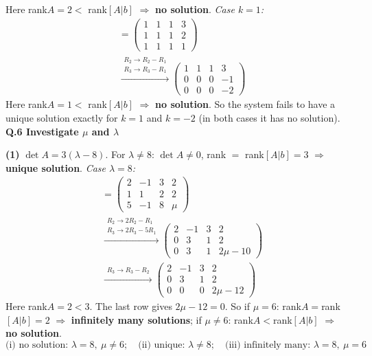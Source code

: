 Here rank$A=2<$ rank$[A|b]$ $\Rightarrow$ \textbf{no solution}.
\noindent\emph{Case $k=1$:}
\begin{align*}
[A|b] &= \left(\begin{array}{ccc|c}1 & 1 & 1 & 3 \\ 1 & 1 & 1 & 2 \\ 1 & 1 & 1 & 1\end{array}\right) \\
&\xrightarrow{\substack{R_2\to R_2-R_1\\ R_3\to R_3-R_1}} \left(\begin{array}{ccc|c}1 & 1 & 1 & 3 \\ 0 & 0 & 0 & -1 \\ 0 & 0 & 0 & -2\end{array}\right)
\end{align*}
Here rank$A=1<$ rank$[A|b]$ $\Rightarrow$ \textbf{no solution}.
So the system fails to have a unique solution exactly for $k=1$ and $k=-2$ (in both cases it has no solution).
\medskip\noindent\textbf{Q.6  Investigate $\mu$ and $\lambda$}\par\smallskip

\noindent\textbf{(1)}
$\det A=3 \left(\lambda - 8\right)$.
For $\lambda\ne 8$: $\det A\neq0$, rank $=$ rank$[A|b]=3$ $\Rightarrow$ \textbf{unique solution}.
\noindent\emph{Case $\lambda=8$:}
\begin{align*}
[A|b] &= \left(\begin{array}{ccc|c}2 & -1 & 3 & 2 \\ 1 & 1 & 2 & 2 \\ 5 & -1 & 8 & \mu\end{array}\right) \\
&\xrightarrow{\substack{R_2\to 2R_2-R_1\\ R_3\to 2R_3-5R_1}} \left(\begin{array}{ccc|c}2 & -1 & 3 & 2 \\ 0 & 3 & 1 & 2 \\ 0 & 3 & 1 & 2 \mu - 10\end{array}\right) \\
&\xrightarrow{\substack{R_3\to R_3-R_2}} \left(\begin{array}{ccc|c}2 & -1 & 3 & 2 \\ 0 & 3 & 1 & 2 \\ 0 & 0 & 0 & 2 \mu - 12\end{array}\right)
\end{align*}
Here rank$A=2<3$. The last row gives $2 \mu - 12=0$. So if $\mu=6$: rank$A=$rank$[A|b]=2$ $\Rightarrow$ \textbf{infinitely many solutions}; if $\mu\neq 6$: rank$A<$rank$[A|b]$ $\Rightarrow$ \textbf{no solution}.
\[ \text{(i) no solution: }\lambda=8,\ \mu\neq 6;\quad \text{(ii) unique: }\lambda\neq 8;\quad \text{(iii) infinitely many: }\lambda=8,\ \mu=6 \]


